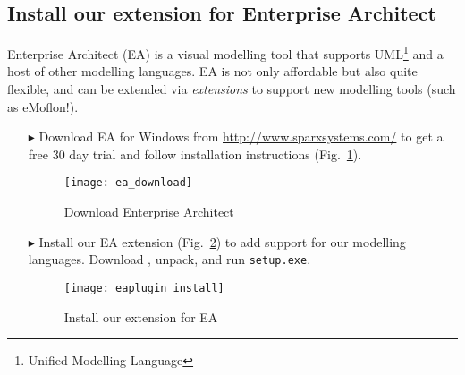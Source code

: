 \newpage

\visHeader
\subsection{Install our extension for Enterprise Architect}

Enterprise Architect (EA) is a visual modelling tool that supports UML\footnote{Unified Modelling Language} and a host of other modelling languages.
EA is not only affordable but also quite flexible, and can be extended via \emph{extensions} to support new modelling tools (such as eMoflon!).

\begin{itemize}
\item[$\blacktriangleright$] Download\hypertarget{installEA vis}{} EA for Windows from \url{http://www.sparxsystems.com/} to get a free 30 day trial and follow
installation instructions (Fig.~\ref{fig_enterpriseArchitextHomepage}).

\begin{figure}[htbp]
	\centering
  	\texttt{[image: ea\_download]}
	\caption{Download Enterprise Architect}
	\label{fig_enterpriseArchitextHomepage}
\end{figure} 

\item[$\blacktriangleright$] Install our EA extension (Fig.~\ref{fig_eaPluginWizard}) to add support for our modelling languages.
Download \EAExtensionLink, unpack, and run \texttt{setup.exe}.

\begin{figure}[htbp]
	\centering
  \texttt{[image: eaplugin\_install]}
	\caption{Install our extension for EA}
	\label{fig_eaPluginWizard}
\end{figure}
\end{itemize}